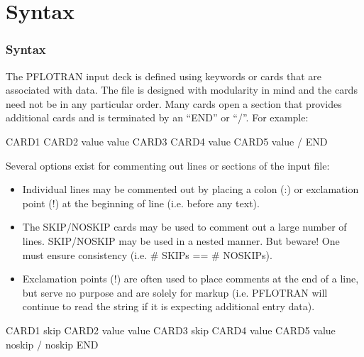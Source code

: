 \section{Syntax}

\begin{frame}\frametitle{Syntax}

The PFLOTRAN input deck is defined using keywords or cards that are associated with data.  The file is designed with modularity in mind and the cards need not be in any particular order.  Many cards open a section that provides additional cards and is terminated by an ``END'' or ``/''.  For example:

\begin{semiverbatim}
CARD1
  CARD2 value value
  CARD3
    CARD4 value
    CARD5 value
  /
END
\end{semiverbatim}


Several options exist for commenting out lines or sections of the input file:
\begin{itemize}
\item Individual lines may be commented out by placing a colon (:) or exclamation point (!) at the beginning of line (i.e. before any text).
\item The SKIP/NOSKIP cards may be used to comment out a large number of lines.  SKIP/NOSKIP may be used in a nested manner.  But beware!  One must ensure consistency (i.e. \# SKIPs == \# NOSKIPs).
\item Exclamation points (!) are often used to place comments at the end of a line, but serve no purpose and are solely for markup (i.e. PFLOTRAN will continue to read the string if it is expecting additional entry data).
\end{itemize}

\begin{semiverbatim}
CARD1
  skip
  CARD2 value value
  CARD3
    skip
    CARD4 value
    CARD5 value
    noskip
  /
  noskip
END
\end{semiverbatim}

\end{frame}
